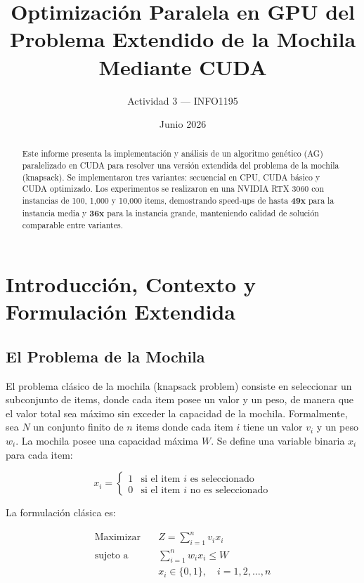 \documentclass[12pt,a4paper]{article}
\title{\textbf{Optimizaci\'on Paralela en GPU del Problema Extendido de la Mochila\\ Mediante CUDA}}
\author{Actividad 3 --- INFO1195}
\date{Junio 2026}
\begin{document}
\maketitle
\thispagestyle{empty}

\begin{abstract}
Este informe presenta la implementaci\'on y an\'alisis de un algoritmo gen\'etico (AG) paralelizado en CUDA para resolver una versi\'on extendida del problema de la mochila (knapsack). Se implementaron tres variantes: secuencial en CPU, CUDA b\'asico y CUDA optimizado. Los experimentos se realizaron en una NVIDIA RTX 3060 con instancias de 100, 1,000 y 10,000 items, demostrando speed-ups de hasta \textbf{49x} para la instancia media y \textbf{36x} para la instancia grande, manteniendo calidad de soluci\'on comparable entre variantes.
\end{abstract}

\newpage
\tableofcontents
\newpage

\section{Introducci\'on, Contexto y Formulaci\'on Extendida}

\subsection{El Problema de la Mochila}

El problema cl\'asico de la mochila (knapsack problem) consiste en seleccionar un subconjunto de items, donde cada item posee un valor y un peso, de manera que el valor total sea m\'aximo sin exceder la capacidad de la mochila. Formalmente, sea $N$ un conjunto finito de $n$ items donde cada item $i$ tiene un valor $v_i$ y un peso $w_i$. La mochila posee una capacidad m\'axima $W$. Se define una variable binaria $x_i$ para cada item:

\[
x_i = \begin{cases} 1 & \text{si el item } i \text{ es seleccionado} \\ 0 & \text{si el item } i \text{ no es seleccionado} \end{cases}
\]

La formulaci\'on cl\'asica es:

\begin{align}
\text{Maximizar} \quad & Z = \sum_{i=1}^{n} v_i x_i \\
\text{sujeto a} \quad & \sum_{i=1}^{n} w_i x_i \leq W \\
& x_i \in \{0, 1\}, \quad i = 1, 2, \ldots, n
\end{align}
\end{document}
